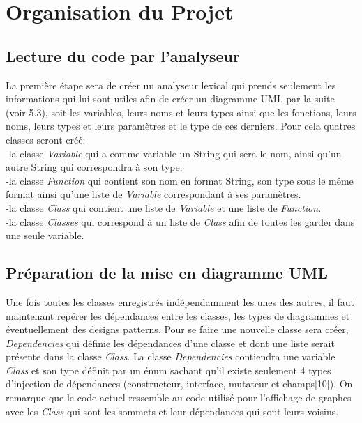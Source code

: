 \documentclass{article}
\begin{document}
    
\section{Organisation du Projet}
\subsection{Lecture du code par l'analyseur}
La première étape sera de créer un analyseur lexical qui prends seulement les informations qui lui sont utiles afin de créer un diagramme UML par la suite (voir 5.3), soit les variables, leurs noms et leurs types ainsi que les fonctions, leurs noms, leurs types et leurs paramètres et le type de ces derniers. Pour cela quatres classes seront créé:\\
-la classe \emph{Variable} qui a comme variable un String qui sera le nom, ainsi qu'un autre String qui correspondra à son type.\\
-la classe \emph{Function} qui contient son nom en format String, son type sous le même format ainsi qu'une liste de \emph{Variable} correspondant à ses paramètres.\\
-la classe \emph{Class} qui contient une liste de \emph{Variable} et une liste de \emph{Function}.\\
-la classe \emph{Classes} qui correspond à un liste de \emph{Class} afin de toutes les garder dans une seule variable.\\
\subsection{Préparation de la mise en diagramme UML}
Une fois toutes les classes enregistrés indépendamment les unes des autres, il faut maintenant repérer les dépendances entre les classes, les types de diagrammes et éventuellement des designs patterns. Pour se faire une nouvelle classe sera créer, \emph{Dependencies} qui définie les dépendances d'une classe et dont une liste serait présente dans la classe \emph{Class}. La classe \emph{Dependencies} contiendra une variable \emph{Class} et son type définit par un énum sachant qu'il existe seulement 4 types d'injection de dépendances (constructeur, interface, mutateur et champs[10]).
On remarque que le code actuel ressemble au code utilisé pour l'affichage de graphes avec les \emph{Class} qui sont les sommets et leur dépendances qui sont leurs voisins.
\end{document}
